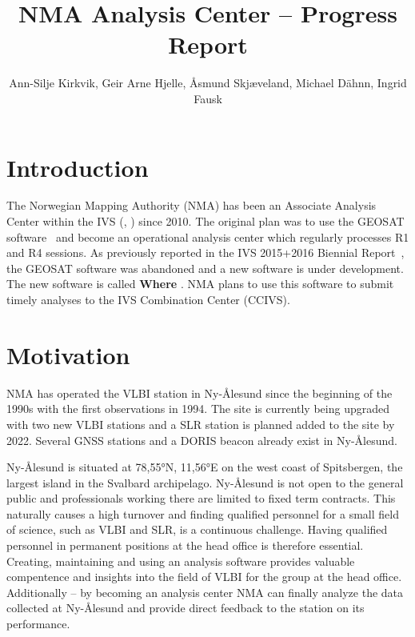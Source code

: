 \documentclass[twocolumn,twoside]{svmultivs_gm} %
\title*{NMA Analysis Center -- Progress Report}
\author{Ann-Silje Kirkvik, Geir Arne Hjelle, {\AA}smund Skj{\ae}veland, Michael D\"ahnn, Ingrid Fausk}
\institute{Norwegian Mapping Authority}
\begin{document}
\maketitle       %
\section{Introduction}
The Norwegian Mapping Authority (NMA) has been an Associate Analysis Center within the IVS (\cite{behrend2013},
\cite{schuh2012}) since 2010.  The original plan was to use the GEOSAT software~\cite{kierulf2010} and become an
operational analysis center which regularly processes R1 and R4 sessions. As previously reported in the IVS 2015+2016
Biennial Report~\cite{kirkvik2017a}, the GEOSAT software was abandoned and a new software is under development. The new
software is called \textbf{Where} \cite{kirkvik2017b}. NMA plans to use this software
to submit timely analyses to the IVS Combination Center (CCIVS).

\section{Motivation}

NMA has operated the VLBI station in Ny-{\AA}lesund since the beginning of the 1990s with the first observations in
1994. The site is currently being upgraded with two new VLBI stations and a SLR station is planned added to the site by
2022. Several GNSS stations and a DORIS beacon already exist in Ny-{\AA}lesund.

Ny-{\AA}lesund is situated at \ang{78,55}N, \ang{11,56}E on the west coast of Spitsbergen, the largest island in the
Svalbard archipelago. Ny-{\AA}lesund is not open to the general public and professionals working there are limited to
fixed term contracts. This naturally causes a high turnover and finding qualified personnel for a small field of
science, such as VLBI and SLR, is a continuous challenge. Having qualified personnel in permanent positions at the head
office is therefore essential. Creating, maintaining and using an analysis software provides valuable compentence and
insights into the field of VLBI for the group at the head office. Additionally -- by becoming an analysis center NMA can finally analyze the
data collected at Ny-{\AA}lesund and provide direct feedback to the station on its performance.
\end{document}
